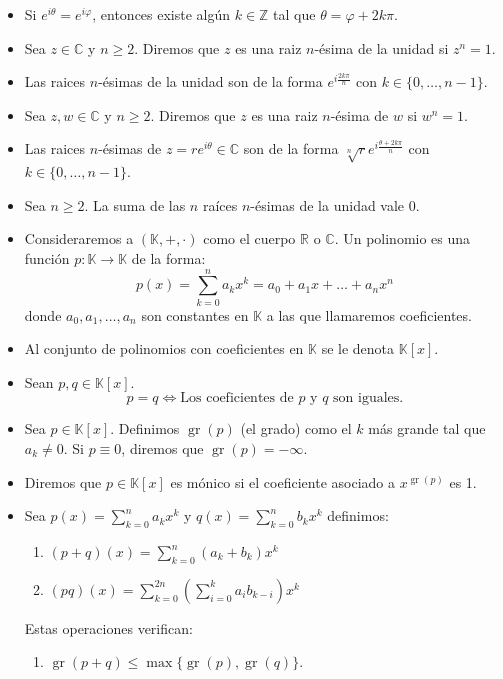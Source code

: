 \documentclass[letterpaper,10pt]{article}
\newcommand{\R}{\mathbb R}
\newcommand{\K}{\mathbb K}
\newcommand{\Z}{\mathbb Z}
\newcommand{\C}{\mathbb C}
\DeclareMathOperator{\gr}{gr}
\theoremstyle{plain}
\begin{document}
\begin{framed}
    \begin{multicols}{2}
    \begin{itemize}
        \item Si $e^{i\theta}=e^{i\varphi}$, entonces existe algún $k \in \Z$ tal que $\theta = \varphi +2k \pi$.
        \item Sea $z \in \C$ y $n \geq 2$. Diremos que $z$ es una raiz $n$-ésima de la unidad si $z^n=1$.
        \item Las raices $n$-ésimas de la unidad son de la forma $e^{i \frac{2k\pi}{n}}$ con $k \in \{0, \dotso ,n-1 \}$.
        \item Sea $z,w \in \C$ y $n \geq 2$. Diremos que $z$ es una raiz $n$-ésima de $w$ si $w^n=1$.
        \item Las raices $n$-ésimas de $z=re^{i\theta} \in \C$ son de la forma $\sqrt[n]{r}e^{i\frac{\theta +2k\pi}{n}}$ con $k \in \{0, \dotso ,n-1 \}$.
        \item Sea $n \geq 2$. La suma de las $n$ raíces $n$-ésimas de la unidad vale 0. 
        \item Consideraremos a $(\K,+,\cdot)$ como el cuerpo $\R $ o $\C$. Un polinomio es una función $p :\K \to \K$ de la forma:
			$$
			p(x)=\sum_{k=0}^{n}a_kx^k=a_0+a_1x+ \dotso + a_nx^n
			$$
			donde $a_0,a_1,\dotso , a_n$ son constantes en $\K$ a las que llamaremos coeficientes.
		\item Al conjunto de polinomios con coeficientes en $\K$ se le denota $\K[x]$. 
		\item Sean $p,q \in \K[x]$.
			$$
			p=q \iff \text{Los coeficientes de $p$ y $q$ son iguales.}
			$$
		\item Sea $p\in \K[x]$. Definimos $\gr(p)$ (el grado) como el $k$ más grande tal que $a_k\neq 0$. Si $p \equiv 0$, diremos que $\gr(p)=-\infty$.
		\item Diremos que $p\in \K[x]$ es mónico si el coeficiente asociado a $x^{\gr(p)}$ es 1.
		\item Sea $p(x)= \sum\limits_{k=0}^{n} a_k x^k$ y $q(x)=\sum\limits_{k=0}^{n} b_k x^k$ definimos:
			\begin{enumerate}
				\item $(p+q)(x)=\sum\limits_{k=0}^{n}(a_k+b_k)x^k$
				\item $(pq)(x)=\sum\limits_{k=0}^{2n}\left(\sum\limits_{i=0}^{k}a_{i}b_{k-i}\right) x^k$
			\end{enumerate}
			Estas operaciones verifican:
		\begin{enumerate}
			\item $\gr(p+q) \leq \max \{ \gr(p), \gr(q) \}$.\\

\end{enumerate}
\end{itemize}
\end{multicols}
\end{framed}
\end{document}
